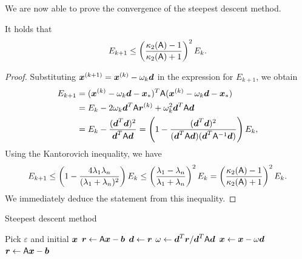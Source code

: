 We are now able to prove the convergence of the steepest descent method.
\begin{theorem}
    \label{theorem:linear_convergenec_steepest_descent}
    It holds that
    \[
        E_{k+1} \leq \left(\frac{\kappa_2(\mathsf A) - 1}{\kappa_2(\mathsf A) + 1}  \right)^2 E_k.
    \]
\end{theorem}
\begin{proof}
    Substituting $\mathbf{\boldsymbol{x}}^{(k+1)} = \mathbf{\boldsymbol{x}}^{(k)} - \omega_k \mathbf{\boldsymbol{d}}$ in the expression for $E_{k+1}$,
    we obtain
    \begin{align*}
        E_{k+1}
        &= (\mathbf{\boldsymbol{x}}^{(k)} - \omega_k \mathbf{\boldsymbol{d}} - \mathbf{\boldsymbol{x}}_*)^T \mathsf A (\mathbf{\boldsymbol{x}}^{(k)} - \omega_k \mathbf{\boldsymbol{d}} - \mathbf{\boldsymbol{x}}_*) \\
        &= E_k - 2 \omega_k \mathbf{\boldsymbol{d}}^T \mathsf A \mathbf{\boldsymbol{r}}^{(k)} + \omega_k^2 \mathbf{\boldsymbol{d}}^T \mathsf A \mathbf{\boldsymbol{d}} \\
        &=  E_k - \frac{(\mathbf{\boldsymbol{d}}^T \mathbf{\boldsymbol{d}})^2}{\mathbf{\boldsymbol{d}}^T \mathsf A \mathbf{\boldsymbol{d}}}
        =  \left( 1 - \frac{(\mathbf{\boldsymbol{d}}^T \mathbf{\boldsymbol{d}})^2}{(\mathbf{\boldsymbol{d}}^T \mathsf A \mathbf{\boldsymbol{d}}) (\mathbf{\boldsymbol{d}}^T \mathsf A^{-1} \mathbf{\boldsymbol{d}})} \right) E_k,
    \end{align*}
    Using the Kantorovich inequality,
    we have
    \begin{align*}
        E_{k+1}
        \leq \left( 1  - \frac{4 \lambda_1 \lambda_n}{(\lambda_1 + \lambda_n)^2}  \right) E_k
        \leq \left(\frac{\lambda_1 - \lambda_n}{\lambda_1 + \lambda_n}  \right)^2 E_k
        = \left(\frac{\kappa_2(\mathsf A) - 1}{\kappa_2(\mathsf A) + 1}  \right)^2 E_k.
    \end{align*}
    We immediately deduce the statement from this inequality.
\end{proof}

\begin{algorithm}
\caption{Steepest descent method}%
\label{algo:steepest_descent_method}%
\begin{algorithmic}[1]
\State Pick $\varepsilon$ and initial $\mathbf{\boldsymbol{x}}$%
\State $\mathbf{\boldsymbol{r}} \gets \mathsf A \mathbf{\boldsymbol{x}} - \mathbf{\boldsymbol{b}}$%
    \State $\mathbf{\boldsymbol{d}} \gets \mathbf{\boldsymbol{r}}$
    \State $\omega \gets \mathbf{\boldsymbol{d}}^T \mathbf{\boldsymbol{r}}/\mathbf{\boldsymbol{d}}^T \mathsf A \mathbf{\boldsymbol{d}}$
    \State $\mathbf{\boldsymbol{x}} \gets \mathbf{\boldsymbol{x}} - \omega \mathbf{\boldsymbol{d}}$
    \State $\mathbf{\boldsymbol{r}} \gets \mathsf A \mathbf{\boldsymbol{x}} - \mathbf{\boldsymbol{b}}$
\EndWhile
\end{algorithmic}
\end{algorithm}

